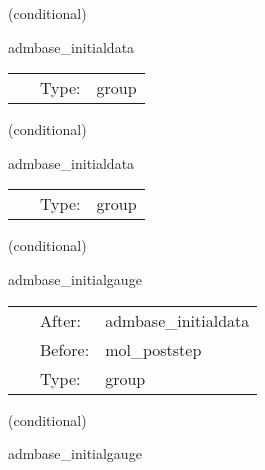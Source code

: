    (conditional) 

\hspace{5mm} admbase\_initialdata 

\hspace{5mm}{\it schedule group for calculating adm initial data } 


\hspace{5mm}

 \begin{tabular*}{160mm}{cll} 
~ & Type:  & group \\ 
\end{tabular*} 


\vspace{5mm}

   (conditional) 

\hspace{5mm} admbase\_initialdata 

\hspace{5mm}{\it schedule group for calculating adm initial data } 


\hspace{5mm}

 \begin{tabular*}{160mm}{cll} 
~ & Type:  & group \\ 
\end{tabular*} 


\vspace{5mm}

   (conditional) 

\hspace{5mm} admbase\_initialgauge 

\hspace{5mm}{\it schedule group for the adm initial gauge condition } 


\hspace{5mm}

 \begin{tabular*}{160mm}{cll} 
~ & After:  & admbase\_initialdata \\ 
~ & Before:  & mol\_poststep \\ 
~ & Type:  & group \\ 
\end{tabular*} 


\vspace{5mm}

   (conditional) 

\hspace{5mm} admbase\_initialgauge 

